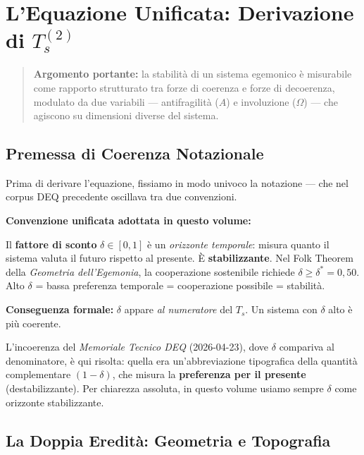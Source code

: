 \chapter{\texorpdfstring{L'Equazione Unificata: Derivazione di
\(T_s^{(2)}\)}{L'Equazione Unificata: Derivazione di T\_s\^{}\{(2)\}}}\label{lequazione-unificata-derivazione-di-t_s2}

\begin{quote}
\textbf{Argomento portante:} la stabilità di un sistema egemonico è
misurabile come rapporto strutturato tra forze di coerenza e forze di
decoerenza, modulato da due variabili --- antifragilità (\(A\)) e
involuzione (\(\Omega\)) --- che agiscono su dimensioni diverse del
sistema.
\end{quote}



\section{Premessa di Coerenza
Notazionale}\label{premessa-di-coerenza-notazionale}

Prima di derivare l'equazione, fissiamo in modo univoco la notazione ---
che nel corpus DEQ precedente oscillava tra due convenzioni.

\Hypoth{} \textbf{Convenzione unificata adottata in questo volume:}

Il \textbf{fattore di sconto} \(\delta \in [0, 1]\) è un \emph{orizzonte
temporale}: misura quanto il sistema valuta il futuro rispetto al
presente. È \textbf{stabilizzante}. Nel Folk Theorem della
\emph{Geometria dell'Egemonia}, la cooperazione sostenibile richiede
\(\delta \geq \delta^* = 0{,}50\). Alto \(\delta\) = bassa preferenza
temporale = cooperazione possibile = stabilità.

\Proved{} \textbf{Conseguenza formale:} \(\delta\) appare \emph{al
numeratore} del \(T_s\). Un sistema con \(\delta\) alto è più coerente.

L'incoerenza del \emph{Memoriale Tecnico DEQ} (2026-04-23), dove
\(\delta\) compariva al denominatore, è qui risolta: quella era
un'abbreviazione tipografica della quantità complementare
\((1-\delta)\), che misura la \textbf{preferenza per il presente}
(destabilizzante). Per chiarezza assoluta, in questo volume usiamo
sempre \(\delta\) come orizzonte stabilizzante.



\section{La Doppia Eredità: Geometria e
Topografia}\label{la-doppia-eredituxe0-geometria-e-topografia}

